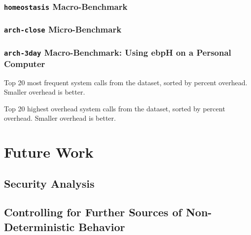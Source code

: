 \documentclass[
  12pt]{findlay}
\begin{document}
\hypertarget{homeostasis-macro-benchmark}{%
\subsubsection{\texorpdfstring{\texttt{homeostasis}
Macro-Benchmark}{homeostasis Macro-Benchmark}}\label{homeostasis-macro-benchmark}}

\hypertarget{arch-close-micro-benchmark}{%
\subsubsection{\texorpdfstring{\texttt{arch-close}
Micro-Benchmark}{arch-close Micro-Benchmark}}\label{arch-close-micro-benchmark}}

\hypertarget{arch-3day-macro-benchmark-using-ebph-on-a-personal-computer}{%
\subsubsection{\texorpdfstring{\texttt{arch-3day} Macro-Benchmark: Using
ebpH on a Personal
Computer}{arch-3day Macro-Benchmark: Using ebpH on a Personal Computer}}\label{arch-3day-macro-benchmark-using-ebph-on-a-personal-computer}}

\begin{table}
    \caption{Top 20 most frequent system calls from the  dataset, sorted by percent overhead. Smaller
    overhead is better.}
    
\end{table}

\begin{table}
    \caption{Top 20 highest overhead system calls from the  dataset, sorted by percent overhead. Smaller
    overhead is better.}
    
\end{table}

\hypertarget{future-work}{%
\section{Future Work}\label{future-work}}

\hypertarget{security-analysis}{%
\subsection{Security Analysis}\label{security-analysis}}

\hypertarget{controlling-for-further-sources-of-non-deterministic-behavior}{%
\subsection{Controlling for Further Sources of Non-Deterministic
Behavior}\label{controlling-for-further-sources-of-non-deterministic-behavior}}
\end{document}
